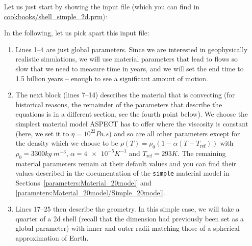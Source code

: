 \documentclass{article}
\newcommand{\aspect}{\textsc{ASPECT}}
\begin{document}
Let us just start by showing the input file (which you can find in
\url{cookbooks/shell_simple_2d.prm}):



In the following, let us pick apart this input file:
\begin{enumerate}
  \item Lines 1--4 are just global parameters. Since we are interested in
  geophysically realistic simulations, we will use material parameters that
  lead to flows so slow that we need to measure time in years, and we will set
  the end time to 1.5 billion years -- enough to see a significant amount of
  motion.

  \item The next block (lines 7--14) describes the material that is convecting
  (for historical reasons, the remainder of the parameters that describe the
  equations is in a different section, see the fourth point below). We choose
  the simplest material model \aspect{} has to offer where the viscosity is
  constant (here, we set it to $\eta=10^{22} \si{Pa .  s}$) and so are
  all other parameters except for the density which we choose to be
  $\rho(T)=\rho_0(1-\alpha (T-T_{\text{ref}}))$ with $\rho_0=3300
  \si{kg}\;\si{m}^{-3}$, $\alpha=\num{4e-5} \si{K}^{-1}$ and
  $T_{\text{ref}}=293 \si{K}$. The remaining material parameters remain at their
  default values and you can find their values described in the documentation of
  the \texttt{simple} material model in
  Sections~\ref{parameters:Material_20model} and
  \ref{parameters:Material_20model/Simple_20model}.

  \item Lines 17--25 then describe the geometry. In this simple case, we will
  take a quarter of a 2d shell (recall that the dimension had previously been
  set as a global parameter) with inner and outer radii matching those of a
  spherical approximation of Earth.


\end{enumerate}
\end{document}
